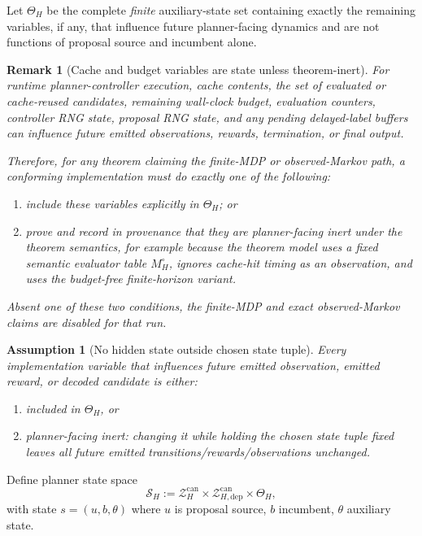\documentclass[11pt]{article}
\newtheorem{remark}{Remark}
\newtheorem{assumption}{Assumption}
\begin{document}
Let $\Theta_H$ be the complete \emph{finite} auxiliary-state set containing
exactly the remaining variables, if any, that influence future planner-facing
dynamics and are not functions of proposal source and incumbent alone.

\begin{remark}[Cache and budget variables are state unless theorem-inert]
For runtime planner-controller execution, cache contents, the set of evaluated
or cache-reused candidates, remaining wall-clock budget, evaluation counters,
controller RNG state, proposal RNG state, and any pending delayed-label
buffers can influence future emitted observations, rewards, termination, or
final output.

Therefore, for any theorem claiming the finite-MDP or observed-Markov path, a
conforming implementation must do exactly one of the following:
\begin{enumerate}
    \item include these variables explicitly in $\Theta_H$; or
    \item prove and record in provenance that they are planner-facing inert
    under the theorem semantics, for example because the theorem model uses a
    fixed semantic evaluator table $M_H^\circ$, ignores cache-hit timing as an
    observation, and uses the budget-free finite-horizon variant.
\end{enumerate}
Absent one of these two conditions, the finite-MDP and exact observed-Markov
claims are disabled for that run.
\end{remark}

\begin{assumption}[No hidden state outside chosen state tuple]\label{ass:no-hidden}
Every implementation variable that influences future emitted observation,
emitted reward, or decoded candidate is either:
\begin{enumerate}
    \item included in $\Theta_H$, or
    \item planner-facing inert: changing it while holding the chosen state tuple
    fixed leaves all future emitted transitions/rewards/observations unchanged.
\end{enumerate}
\end{assumption}

Define planner state space
\[
\mathcal{S}_H:=
\mathcal{Z}_H^{\mathrm{can}}\times \mathcal{Z}_{H,\mathrm{dep}}^{\mathrm{can}}\times \Theta_H,
\]
with state $s=(u,b,\theta)$ where $u$ is proposal source, $b$ incumbent,
$\theta$ auxiliary state.
\end{document}
